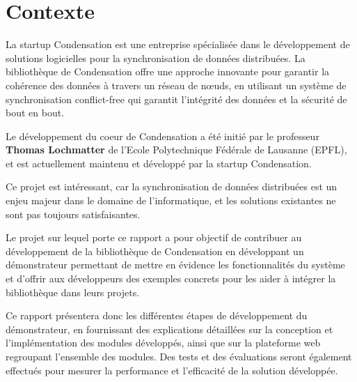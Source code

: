 \section{Contexte}
La startup Condensation est une entreprise spécialisée dans le développement de solutions logicielles pour la synchronisation de données distribuées. La bibliothèque de Condensation offre une approche innovante pour garantir la cohérence des données à travers un réseau de nœuds, en utilisant un système de synchronisation conflict-free qui garantit l'intégrité des données et la sécurité de bout en bout.

Le développement du coeur de Condensation a été initié par le professeur \textbf{Thomas Lochmatter} de l'Ecole Polytechnique Fédérale de Lausanne (EPFL), et est actuellement maintenu et développé par la startup Condensation.

Ce projet est intéressant, car la synchronisation de données distribuées est un enjeu majeur dans le domaine de l'informatique, et les solutions existantes ne sont pas toujours satisfaisantes.

Le projet sur lequel porte ce rapport a pour objectif de contribuer au développement de la bibliothèque de Condensation en développant un démonstrateur permettant de mettre en évidence les fonctionnalités du système et d'offrir aux développeurs des exemples concrets pour les aider à intégrer la bibliothèque dans leurs projets.

Ce rapport présentera donc les différentes étapes de développement du démonstrateur, en fournissant des explications détaillées sur la conception et l'implémentation des modules développés, ainsi que sur la plateforme web regroupant l'ensemble des modules. Des tests et des évaluations seront également effectués pour mesurer la performance et l'efficacité de la solution développée.